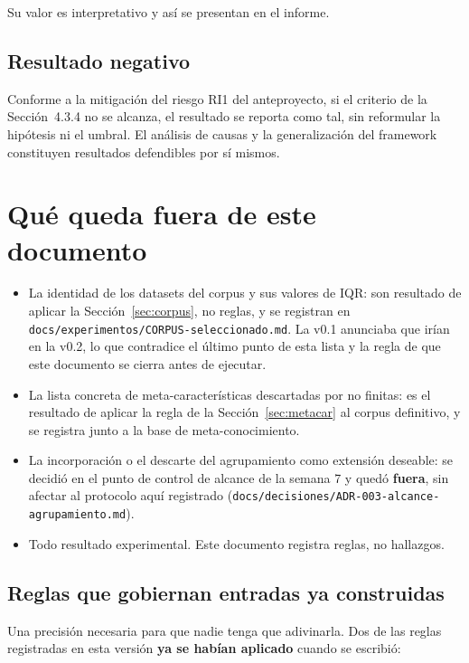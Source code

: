 \documentclass[11pt,letterpaper]{article}
\begin{document}
Su valor es interpretativo y así se presentan en el informe.

\subsection{Resultado negativo}

Conforme a la mitigación del riesgo RI1 del anteproyecto, si el criterio de la
Sección~4.3.4 no se alcanza, el resultado se reporta como tal, sin reformular la
hipótesis ni el umbral. El análisis de causas y la generalización del framework
constituyen resultados defendibles por sí mismos.

\section{Qué queda fuera de este documento}
\label{sec:fuera}

\begin{itemize}
  \item La identidad de los datasets del corpus y sus valores de IQR: son
        resultado de aplicar la Sección~\ref{sec:corpus}, no reglas, y se
        registran en \texttt{docs/experimentos/CORPUS-seleccionado.md}. La v0.1
        anunciaba que irían en la v0.2, lo que contradice el último punto de esta
        lista y la regla de que este documento se cierra antes de ejecutar.
  \item La lista concreta de meta-características descartadas por no finitas: es
        el resultado de aplicar la regla de la Sección~\ref{sec:metacar} al corpus
        definitivo, y se registra junto a la base de meta-conocimiento.
  \item La incorporación o el descarte del agrupamiento como extensión deseable:
        se decidió en el punto de control de alcance de la semana 7 y quedó
        \textbf{fuera}, sin afectar al protocolo aquí registrado
        (\texttt{docs/decisiones/ADR-003-alcance-agrupamiento.md}).
  \item Todo resultado experimental. Este documento registra reglas, no
        hallazgos.
\end{itemize}

\subsection{Reglas que gobiernan entradas ya construidas}

Una precisión necesaria para que nadie tenga que adivinarla. Dos de las reglas
registradas en esta versión \textbf{ya se habían aplicado} cuando se escribió:
\end{document}

